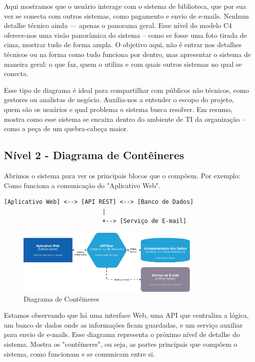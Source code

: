 \documentclass[a4paper,11pt]{article}
\begin{document}
Aqui mostramos que o usuário interage com o sistema de biblioteca, que por sua vez se conecta com outros sistemas, como pagamento e envio de e-mails. Nenhum detalhe técnico ainda — apenas o
panorama geral. Esse nível do modelo C4 oferece-nos uma visão panorâmica do sistema – como se fosse uma foto tirada de cima, mostrar tudo de forma ampla. O objetivo aqui, não é entrar nos detalhes técnicos ou na forma como tudo funciona por dentro, mas apresentar o sistema de maneira geral: o que faz, quem o utiliza e com quais outros sistemas no qual se conecta.

Esse tipo de diagrama é ideal para compartilhar com públicos não técnicos, como gestores ou
analistas de negócio. Auxilia-nos a entender o escopo do projeto, quem são os usuários e qual
problema o sistema busca resolver. Em resumo, mostra como esse sistema se encaixa dentro do
ambiente de TI da organização – como a peça de um quebra-cabeça maior.

\subsection{Nível 2 - Diagrama de Contêineres}
Abrimos o sistema para ver os principais blocos que o compõem. Por exemplo: Como funciona a
comunicação do "Aplicativo Web". \vspace{-1em}
\begin{verbatim}
[Aplicativo Web] <--> [API REST] <--> [Banco de Dados]
                            |
                            +--> [Serviço de E-mail]
\end{verbatim}

\begin{figure}[!htb]
	\centering
	\includegraphics[width=0.8\textwidth]{imagens/Conteiners}
	\caption{Diagrama de Contêineres}
\end{figure}

Estamos observando que há uma interface Web, uma API que centraliza a lógica, um banco de
dados onde as informações ficam guardadas, e um serviço auxiliar para envio de e-mails. Esse diagrama representa o próximo nível de detalhe do sistema. Mostra os "contêineres", ou seja, as partes principais que compõem o sistema, como funcionam e se comunicam entre si.
\end{document}

